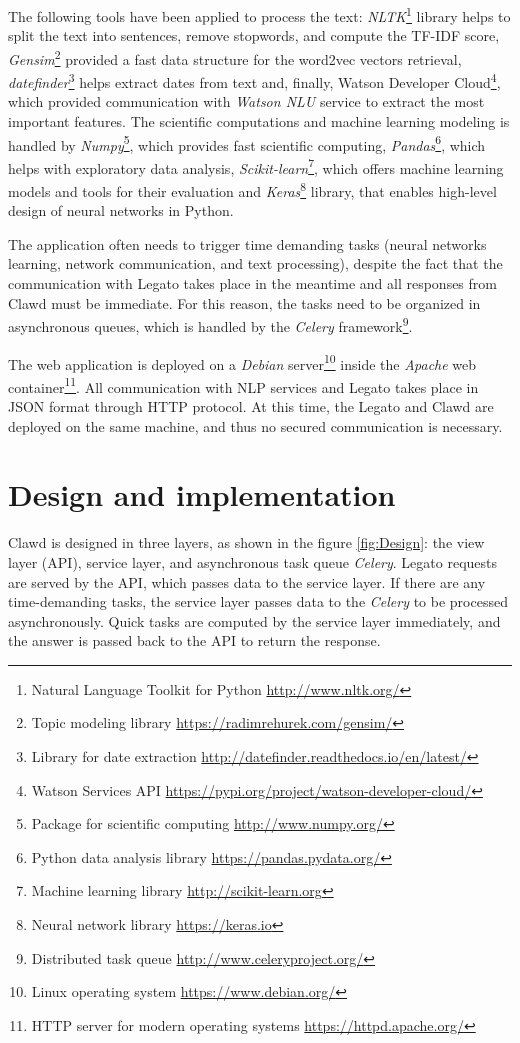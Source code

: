\documentclass[
  digital, %
  notable,   %
  nolof,     %
  nolot,     %
]{fithesis3}
\begin{document}
The following tools have been applied to process the text:
\textit{NLTK}\footnote{Natural Language Toolkit for Python \url{http://www.nltk.org/}} library helps to split the text into sentences, remove stopwords, and compute the TF-IDF score, 
\textit{Gensim}\footnote{Topic modeling library \url{https://radimrehurek.com/gensim/}} provided a fast data structure for the word2vec vectors retrieval, \textit{datefinder}\footnote{Library for date extraction \url{http://datefinder.readthedocs.io/en/latest/}}
helps extract dates from text and, finally,
Watson Developer Cloud\footnote{Watson Services API \url{https://pypi.org/project/watson-developer-cloud/}}, which provided communication with \textit{Watson NLU} service to extract the most important features.
The scientific computations and machine learning modeling is handled by \textit{Numpy}\footnote{Package for scientific computing \url{http://www.numpy.org/}}, which provides fast scientific computing,
\textit{Pandas}\footnote{Python data analysis library \url{https://pandas.pydata.org/}}, which helps with exploratory data analysis,
\textit{Scikit-learn}\footnote{Machine learning library \url{http://scikit-learn.org}}, which offers machine learning models and tools for their evaluation and
\textit{Keras}\footnote{Neural network library \url{https://keras.io}} library, that enables high-level design of neural networks in Python.

The application often needs to trigger time demanding tasks (neural networks learning, network communication, and text processing), despite the fact that the communication with Legato takes place in the meantime and all responses from Clawd must be immediate.
For this reason, the tasks need to be organized in asynchronous queues, which is handled by the \textit{Celery} framework\footnote{Distributed task queue \url{http://www.celeryproject.org/}}.

The web application is deployed on a \textit{Debian} server\footnote{Linux operating system \url{https://www.debian.org/}} inside the \textit{Apache} web container\footnote{HTTP server for modern operating systems \url{https://httpd.apache.org/}}.
All communication with NLP services and Legato takes place in JSON format through HTTP protocol.
At this time, the Legato and Clawd are deployed on the same machine, and thus no secured communication is necessary.

\section{Design and implementation}
Clawd is designed in three layers, as shown in the figure \ref{fig:Design}: the view layer (API), service layer, and asynchronous task queue \textit{Celery}.
Legato requests are served by the API, which passes data to the service layer.
If there are any time-demanding tasks, the service layer passes data to the \textit{Celery} to be processed asynchronously.
Quick tasks are computed by the service layer immediately, and the answer is passed back to the API to return the response.
\end{document}
